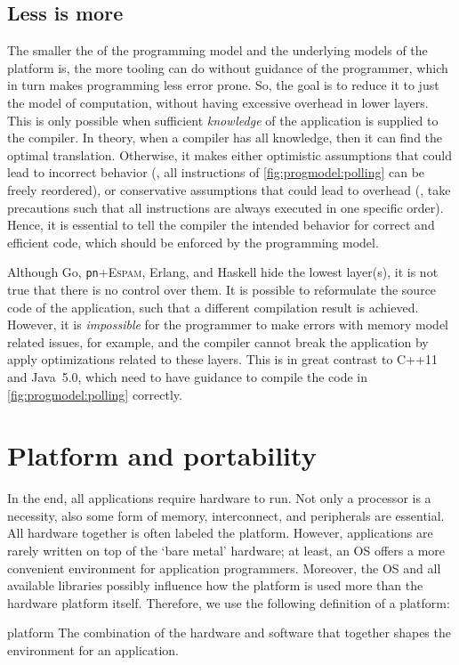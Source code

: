 \subsection{Less is more}
\label{s:progmodel:small_overlap}

The smaller the  of the programming model and the underlying models of the platform is, the more tooling can do without guidance of the programmer, which in turn makes programming less error prone.
So, the goal is to reduce it to just the model of computation, without having excessive overhead in lower layers.
This is only possible when sufficient \emph{knowledge} of the application is supplied to the compiler.
In theory, when a compiler has all knowledge, then it can find the optimal translation.
Otherwise, it makes either optimistic assumptions that could lead to incorrect behavior (\eg, all instructions of \vref{fig:progmodel:polling} can be freely reordered), or conservative assumptions that could lead to overhead (\eg, take precautions such that all instructions are always executed in one specific order).
Hence, it is essential to tell the compiler the intended behavior for correct and efficient code, which should be enforced by the programming model.

Although Go, \texttt{pn}+\textsc{Espam}, Erlang, and Haskell hide the lowest layer(s), it is not true that there is no control over them.
It is possible to reformulate the source code of the application, such that a different compilation result is achieved.
However, it is \emph{impossible} for the programmer to make errors with memory model related issues, for example, and the compiler cannot break the application by apply optimizations related to these layers.
This is in great contrast to C++11 and Java~5.0, which need to have guidance to compile the code in \cref{fig:progmodel:polling} correctly.


\section{Platform and portability}
\label{s:progmodel:platform}

In the end, all applications require hardware to run.
Not only a processor is a necessity, also some form of memory, interconnect, and peripherals are essential.
All hardware together is often labeled the platform.
However, applications are rarely written on top of the `bare metal' hardware; at least, an \ac{OS} offers a more convenient environment for application programmers.
Moreover, the \ac{OS} and all available libraries possibly influence how the platform is used more than the hardware platform itself.
Therefore, we use the following definition of a platform:
\begin{describe}{platform}
The combination of the hardware and software that together shapes the environment for an application.
\end{describe}

